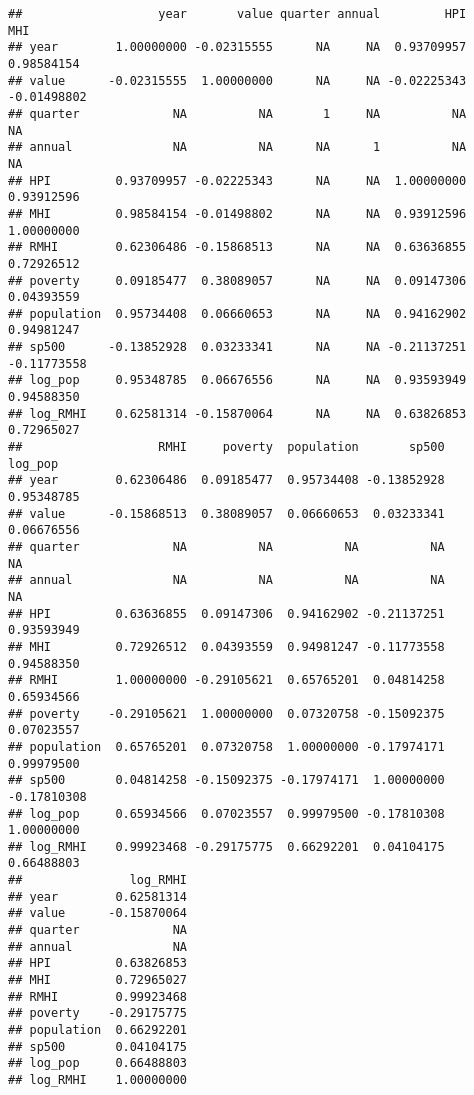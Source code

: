 \documentclass[
]{article}
\newenvironment{Shaded}{\begin{snugshade}}{\end{snugshade}}
\newcommand{\DataTypeTok}[1]{\textcolor[rgb]{0.13,0.29,0.53}{#1}}
\newcommand{\DecValTok}[1]{\textcolor[rgb]{0.00,0.00,0.81}{#1}}
\newcommand{\KeywordTok}[1]{\textcolor[rgb]{0.13,0.29,0.53}{\textbf{#1}}}
\newcommand{\NormalTok}[1]{#1}
\newcommand{\OperatorTok}[1]{\textcolor[rgb]{0.81,0.36,0.00}{\textbf{#1}}}
\newcommand{\StringTok}[1]{\textcolor[rgb]{0.31,0.60,0.02}{#1}}
\begin{document}
\begin{verbatim}
##                   year       value quarter annual         HPI         MHI
## year        1.00000000 -0.02315555      NA     NA  0.93709957  0.98584154
## value      -0.02315555  1.00000000      NA     NA -0.02225343 -0.01498802
## quarter             NA          NA       1     NA          NA          NA
## annual              NA          NA      NA      1          NA          NA
## HPI         0.93709957 -0.02225343      NA     NA  1.00000000  0.93912596
## MHI         0.98584154 -0.01498802      NA     NA  0.93912596  1.00000000
## RMHI        0.62306486 -0.15868513      NA     NA  0.63636855  0.72926512
## poverty     0.09185477  0.38089057      NA     NA  0.09147306  0.04393559
## population  0.95734408  0.06660653      NA     NA  0.94162902  0.94981247
## sp500      -0.13852928  0.03233341      NA     NA -0.21137251 -0.11773558
## log_pop     0.95348785  0.06676556      NA     NA  0.93593949  0.94588350
## log_RMHI    0.62581314 -0.15870064      NA     NA  0.63826853  0.72965027
##                   RMHI     poverty  population       sp500     log_pop
## year        0.62306486  0.09185477  0.95734408 -0.13852928  0.95348785
## value      -0.15868513  0.38089057  0.06660653  0.03233341  0.06676556
## quarter             NA          NA          NA          NA          NA
## annual              NA          NA          NA          NA          NA
## HPI         0.63636855  0.09147306  0.94162902 -0.21137251  0.93593949
## MHI         0.72926512  0.04393559  0.94981247 -0.11773558  0.94588350
## RMHI        1.00000000 -0.29105621  0.65765201  0.04814258  0.65934566
## poverty    -0.29105621  1.00000000  0.07320758 -0.15092375  0.07023557
## population  0.65765201  0.07320758  1.00000000 -0.17974171  0.99979500
## sp500       0.04814258 -0.15092375 -0.17974171  1.00000000 -0.17810308
## log_pop     0.65934566  0.07023557  0.99979500 -0.17810308  1.00000000
## log_RMHI    0.99923468 -0.29175775  0.66292201  0.04104175  0.66488803
##               log_RMHI
## year        0.62581314
## value      -0.15870064
## quarter             NA
## annual              NA
## HPI         0.63826853
## MHI         0.72965027
## RMHI        0.99923468
## poverty    -0.29175775
## population  0.66292201
## sp500       0.04104175
## log_pop     0.66488803
## log_RMHI    1.00000000
\end{verbatim}

\begin{Shaded}
\end{Shaded}
\end{document}
